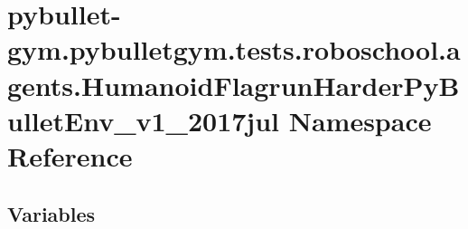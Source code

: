 \hypertarget{namespacepybullet-gym_1_1pybulletgym_1_1tests_1_1roboschool_1_1agents_1_1_humanoid_flagrun_harder_py_bullet_env__v1__2017jul}{}\section{pybullet-\/gym.pybulletgym.\+tests.\+roboschool.\+agents.\+Humanoid\+Flagrun\+Harder\+Py\+Bullet\+Env\+\_\+v1\+\_\+2017jul Namespace Reference}
\label{namespacepybullet-gym_1_1pybulletgym_1_1tests_1_1roboschool_1_1agents_1_1_humanoid_flagrun_harder_py_bullet_env__v1__2017jul}
\subsection*{Variables}
